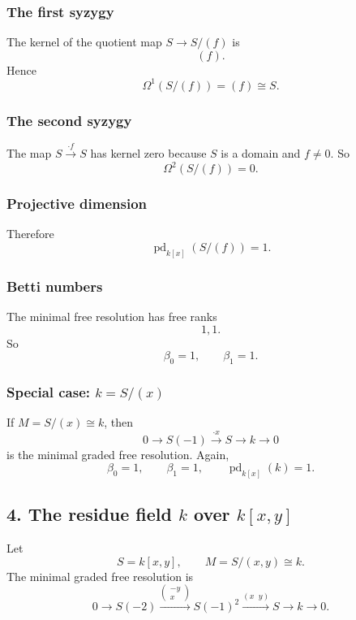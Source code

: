 \documentclass[12pt,a4paper]{article}
\theoremstyle{notespace}
\theoremstyle{definition}
\begin{document}
\subsubsection*{The first syzygy}

The kernel of the quotient map \(S\to S/(f)\) is
\[
(f).
\]
Hence
\[
\Omega^1(S/(f))=(f)\cong S.
\]

\subsubsection*{The second syzygy}

The map \(S\xrightarrow{\cdot f}S\) has kernel zero because \(S\) is a domain and \(f\neq 0\).
So
\[
\Omega^2(S/(f))=0.
\]

\subsubsection*{Projective dimension}

Therefore
\[
\operatorname{pd}_{k[x]}(S/(f))=1.
\]

\subsubsection*{Betti numbers}

The minimal free resolution has free ranks
\[
1,1.
\]
So
\[
\beta_0=1,\qquad \beta_1=1.
\]

\subsubsection*{Special case: \(k=S/(x)\)}

If \(M=S/(x)\cong k\), then
\[
0 \longrightarrow S(-1) \xrightarrow{\cdot x} S \longrightarrow k \longrightarrow 0
\]
is the minimal graded free resolution.
Again,
\[
\beta_0=1,\qquad \beta_1=1,
\qquad
\operatorname{pd}_{k[x]}(k)=1.
\]

\subsection{4. The residue field \(k\) over \(k[x,y]\)}

Let
\[
S=k[x,y], \qquad M=S/(x,y)\cong k.
\]
The minimal graded free resolution is
\[
0 \longrightarrow S(-2) \xrightarrow{\begin{pmatrix}-y\\x\end{pmatrix}} S(-1)^2
\xrightarrow{(x\;\;y)} S \longrightarrow k \longrightarrow 0.
\]
\end{document}
